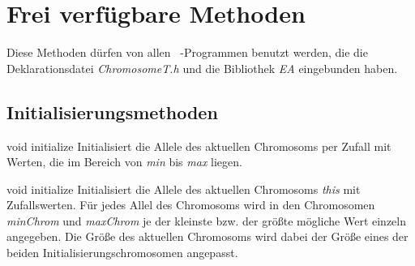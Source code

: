 \documentclass{report}
\begin{document}
\newpage
\section{Frei verf\"ugbare Methoden}
Diese Methoden d\"urfen von allen \cpp\ -Programmen benutzt werden, die
die Deklarationsdatei {\em ChromosomeT.h} und die Bibliothek {\em EA}
eingebunden haben.
 


\subsection{Initialisierungsmethoden}

\setNormalInstance
\setCorrectWidthThree{8pt}
\printMethodWithParamsSaved
{void}
{}
{initialize}
{Initialisiert die Allele des aktuellen Chromosoms per Zufall mit Werten,
    die im Bereich von {\em min} bis {\em max} liegen.}
{}
\setCorrectWidthThree{4pt}

\newpage

\setNormalInstance
\setCorrectWidthThree{8pt}
\printMethodWithParamsSaved
{void}
{}
{initialize}
{Initialisiert die Allele des aktuellen Chromosoms {\em this} mit Zufallswerten.
    F\"ur jedes Allel des Chromosoms wird in den Chromosomen {\em minChrom} und
    {\em maxChrom} je der kleinste bzw. der gr\"o{\ss}te m\"ogliche Wert einzeln
    angegeben. Die Gr\"o{\ss}e des aktuellen Chromosoms wird dabei der
    Gr\"o{\ss}e eines der beiden Initialisierungschromosomen angepasst.}
{}
\setCorrectWidthThree{4pt}
\end{document}

